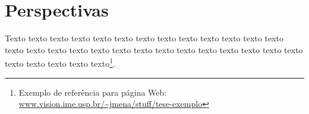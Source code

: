 \chapter{Perspectivas}
\label{cap:perspectivas}

Texto texto texto texto texto texto texto texto texto texto texto texto texto
texto texto texto texto texto texto texto texto texto texto texto texto texto
texto texto texto texto texto texto\footnote{Exemplo de referência para página
Web: \url{www.vision.ime.usp.br/~jmena/stuff/tese-exemplo}}.

